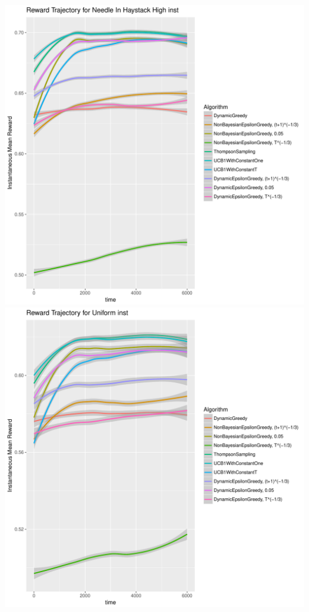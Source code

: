 \documentclass[11pt,letterpaper]{article}
\begin{document}
\includegraphics[scale=0.5]{"../results/Reward Trajectory for Needle In Haystack High inst"} \\
\includegraphics[scale=0.5]{"../results/Reward Trajectory for Uniform inst"} \\
\end{document}
